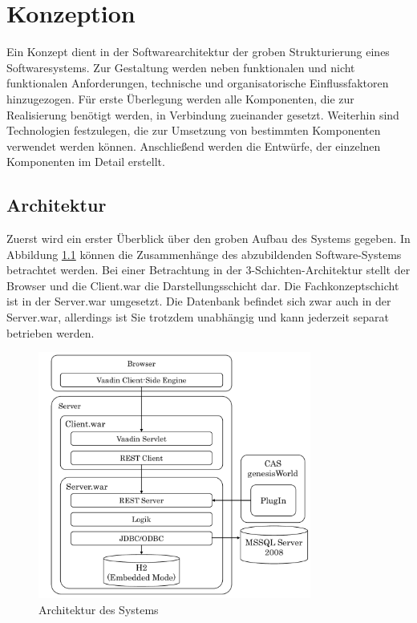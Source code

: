 
\chapter{Konzeption}

Ein Konzept dient in der Softwarearchitektur der groben Strukturierung eines Softwaresystems. Zur Gestaltung werden neben funktionalen und nicht funktionalen Anforderungen, technische und organisatorische Einflussfaktoren hinzugezogen. Für erste Überlegung werden alle Komponenten, die zur Realisierung benötigt werden, in Verbindung zueinander gesetzt. Weiterhin sind Technologien festzulegen, die zur Umsetzung von bestimmten Komponenten verwendet werden können. Anschließend werden die Entwürfe, der einzelnen Komponenten im Detail erstellt.  

\section{Architektur}

Zuerst wird ein erster Überblick über den groben Aufbau des Systems gegeben. In Abbildung \ref{konzept_architektur} können die Zusammenhänge des abzubildenden Software-Systems betrachtet werden. Bei einer Betrachtung in der 3-Schichten-Architektur stellt der Browser und die Client.war die Darstellungsschicht dar. Die Fachkonzeptschicht ist in der Server.war umgesetzt. Die Datenbank befindet sich zwar auch in der Server.war, allerdings ist Sie trotzdem unabhängig und kann jederzeit separat betrieben werden.

\begin{figure}[htbp]
\centering
  \includegraphics[width=0.8\textwidth, width=0.8\textwidth]{pics/Konzept_architektur.pdf}
\caption{Architektur des Systems}
\label{konzept_architektur}
\end{figure} 

